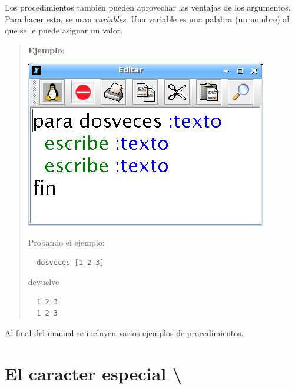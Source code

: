Los procedimientos tambi\'en pueden aprovechar las ventajas de los argumentos.
Para hacer esto, se usan \textit{variables}.  Una
variable es una palabra (un nombre) al que se le puede asignar un valor. 
\begin{quote}
   \noindent \textbf{Ejemplo}:
   \begin{center}
      \includegraphics[scale=0.3]{Imagenes/04_Convenciones/EditorProc_02.png}
   \end{center}
   \noindent Probando el ejemplo:
   \begin{verbatim}
  dosveces [1 2 3] \end{verbatim}
   devuelve 
   \begin{verbatim}
  1 2 3
  1 2 3 \end{verbatim}
\end{quote}
Al final del manual se incluyen varios ejemplos de procedimientos.

\section{El caracter especial \textbackslash{}}
   \label{El-caracter-backslash}

